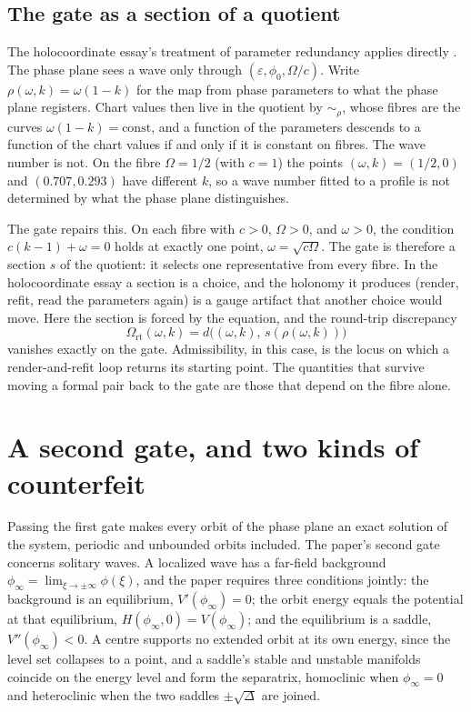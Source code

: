 \documentclass[11pt]{article}
\theoremstyle{definition}
\theoremstyle{remark}
\begin{document}
\subsection{The gate as a section of a quotient}

The holocoordinate essay's treatment of parameter redundancy applies directly \cite{holo}. The phase plane sees a wave only through $(\varepsilon,\phi_0,\Omega/c)$. Write $\rho(\omega,k)=\omega(1-k)$ for the map from phase parameters to what the phase plane registers. Chart values then live in the quotient by $\sim_\rho$, whose fibres are the curves $\omega(1-k)=\text{const}$, and a function of the parameters descends to a function of the chart values if and only if it is constant on fibres. The wave number is not. On the fibre $\Omega=1/2$ (with $c=1$) the points $(\omega,k)=(1/2,0)$ and $(0.707,0.293)$ have different $k$, so a wave number fitted to a profile is not determined by what the phase plane distinguishes.

The gate repairs this. On each fibre with $c>0$, $\Omega>0$, and $\omega>0$, the condition $c(k-1)+\omega=0$ holds at exactly one point, $\omega=\sqrt{c\Omega}$. The gate is therefore a section $s$ of the quotient: it selects one representative from every fibre. In the holocoordinate essay a section is a choice, and the holonomy it produces (render, refit, read the parameters again) is a gauge artifact that another choice would move. Here the section is forced by the equation, and the round-trip discrepancy
\[
  \Omega_{\mathrm{rt}}(\omega,k)=d\big((\omega,k),\,s(\rho(\omega,k))\big)
\]
vanishes exactly on the gate. Admissibility, in this case, is the locus on which a render-and-refit loop returns its starting point. The quantities that survive moving a formal pair back to the gate are those that depend on the fibre alone.

\section{A second gate, and two kinds of counterfeit}

Passing the first gate makes every orbit of the phase plane an exact solution of the system, periodic and unbounded orbits included. The paper's second gate concerns solitary waves. A localized wave has a far-field background $\phi_\infty=\lim_{\xi\to\pm\infty}\phi(\xi)$, and the paper requires three conditions jointly: the background is an equilibrium, $V'(\phi_\infty)=0$; the orbit energy equals the potential at that equilibrium, $H(\phi_\infty,0)=V(\phi_\infty)$; and the equilibrium is a saddle, $V''(\phi_\infty)<0$. A centre supports no extended orbit at its own energy, since the level set collapses to a point, and a saddle's stable and unstable manifolds coincide on the energy level and form the separatrix, homoclinic when $\phi_\infty=0$ and heteroclinic when the two saddles $\pm\sqrt\Delta$ are joined.
\end{document}
